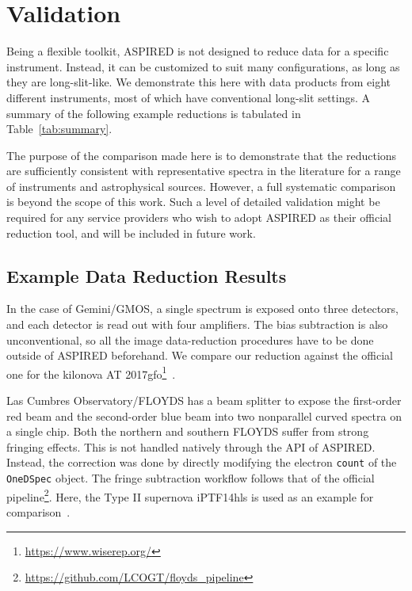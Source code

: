 \documentclass[linenumbers, twocolumn]{aastex631}
\begin{document}
\section{Validation}
\label{sec:examples}
Being a flexible toolkit, \textsc{ASPIRED} is not designed to reduce data for a
specific instrument. Instead, it can be customized to suit many configurations,
as long as they are long-slit-like. We demonstrate this here with data products
from eight different instruments, most of which have conventional long-slit
settings. A summary of the following example reductions is tabulated in
Table~\ref{tab:summary}.

The purpose of the comparison made here is to demonstrate that
the reductions are sufficiently consistent with representative spectra in the literature
for a range of instruments and astrophysical sources. However, a full
systematic comparison is beyond the scope of this work. Such a level of
detailed validation might be required for any service providers who wish to
adopt \textsc{ASPIRED} as their official reduction tool, and will be
included in future work.

\subsection{Example Data Reduction Results}
In the case of Gemini/GMOS, a single spectrum is exposed onto
three detectors, and each detector is read out with four amplifiers. The bias 
subtraction is also unconventional, so all the image data-reduction procedures
have to be done outside of \textsc{ASPIRED} beforehand. We compare our reduction against
the official one for the kilonova AT 2017gfo\footnote{\url{https://www.wiserep.org/}}~\citep{2017ApJ...848L..32M}. 

Las Cumbres Observatory/FLOYDS has a beam splitter to expose the first-order
red beam and the second-order blue beam into two nonparallel
curved spectra on a single chip. Both the northern and southern FLOYDS suffer
from strong fringing effects. This is not handled natively through the API of 
\textsc{ASPIRED}. Instead, the correction was done by directly modifying the
electron \texttt{count} of the \texttt{OneDSpec} object. The fringe subtraction
workflow follows that of the official
pipeline\footnote{\url{https://github.com/LCOGT/floyds_pipeline}}. Here, the
Type II supernova iPTF14hls is used as an example for
comparison~\citep{2017Natur.551..210A}.
\end{document}
